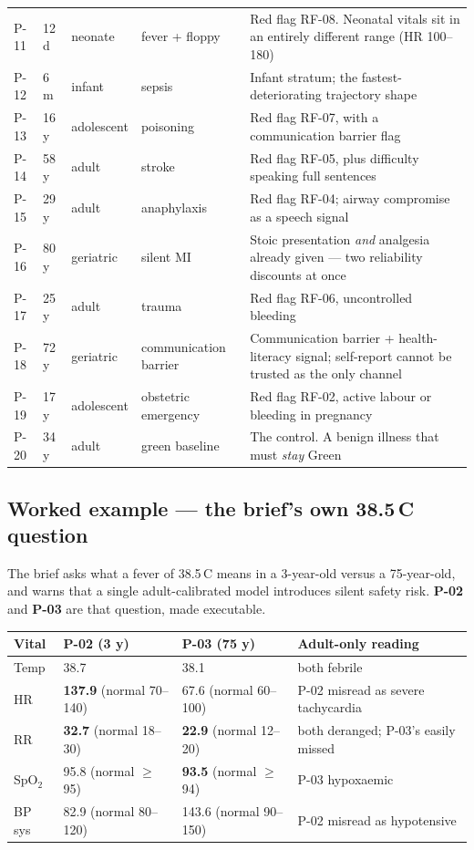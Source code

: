\documentclass[10pt,a4paper,twocolumn]{article}
\newcommand{\pid}[1]{{\sffamily\bfseries\color{SecPurple}#1}}
\begin{document}
\begin{table}[t]
\begin{tabular}{@{}llllp{7.4cm}@{}}
P-11 & 12 d & neonate & fever + floppy & Red flag RF-08. Neonatal vitals sit in an entirely different range (HR 100--180)\\
P-12 & 6 m & infant & sepsis & Infant stratum; the fastest-deteriorating trajectory shape\\
P-13 & 16 y & adolescent & poisoning & Red flag RF-07, with a communication barrier flag\\
P-14 & 58 y & adult & stroke & Red flag RF-05, plus difficulty speaking full sentences\\
P-15 & 29 y & adult & anaphylaxis & Red flag RF-04; airway compromise as a speech signal\\
P-16 & 80 y & geriatric & silent MI & Stoic presentation \emph{and} analgesia already given --- two reliability discounts at once\\
P-17 & 25 y & adult & trauma & Red flag RF-06, uncontrolled bleeding\\
P-18 & 72 y & geriatric & communication barrier & Communication barrier + health-literacy signal; self-report cannot be trusted as the only channel\\
P-19 & 17 y & adolescent & obstetric emergency & Red flag RF-02, active labour or bleeding in pregnancy\\
P-20 & 34 y & adult & green baseline & The control. A benign illness that must \emph{stay} Green\\
\bottomrule
\end{tabular}
\end{table}

\subsection{Worked example --- the brief's own 38.5\,\textdegree C question}
The brief asks what a fever of 38.5\,\textdegree C means in a 3-year-old versus a 75-year-old, and
warns that a single adult-calibrated model introduces silent safety risk. \pid{P-02} and
\pid{P-03} are that question, made executable.

\begin{center}\footnotesize\sffamily
\begin{tabular}{@{}p{1.05cm}p{1.75cm}p{1.75cm}p{2.5cm}@{}}
\toprule
\rowcolor{AccPurple!10}
\textbf{Vital} & \textbf{P-02 (3 y)} & \textbf{P-03 (75 y)} & \textbf{Adult-only reading}\\
\midrule
Temp & 38.7 & 38.1 & both febrile\\
HR & \textbf{137.9} (normal 70--140) & 67.6 (normal 60--100) & P-02 misread as severe tachycardia\\
RR & \textbf{32.7} (normal 18--30) & \textbf{22.9} (normal 12--20) & both deranged; P-03's easily missed\\
SpO$_2$ & 95.8 (normal $\ge$95) & \textbf{93.5} (normal $\ge$94) & P-03 hypoxaemic\\
BP sys & 82.9 (normal 80--120) & 143.6 (normal 90--150) & P-02 misread as hypotensive\\
\bottomrule
\end{tabular}
\end{center}
\end{document}
